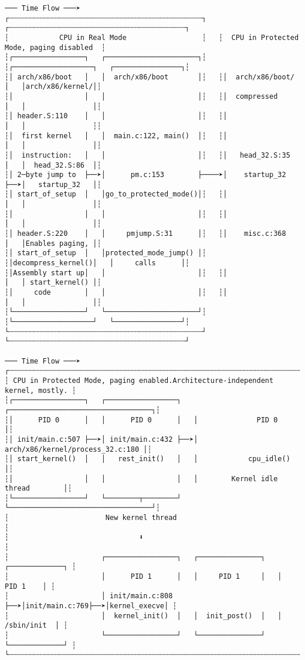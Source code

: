 \documentclass[varwidth=100em]{standalone}
\begin{document}
\begin{verbatim}
─── Time Flow ───➤
┌┄┄┄┄┄┄┄┄┄┄┄┄┄┄┄┄┄┄┄┄┄┄┄┄┄┄┄┄┄┄┄┄┄┄┄┄┄┄┄┄┄┄┄┄┄┄┐   ┌┄┄┄┄┄┄┄┄┄┄┄┄┄┄┄┄┄┄┄┄┄┄┄┄┄┄┄┄┄┄┄┄┄┄┄┄┄┄┄┄┄┄┐
┆            CPU in Real Mode                  ┆   ┆  CPU in Protected Mode, paging disabled  ┆
┆┌─────────────────┐   ┌──────────────────────┐┆   ┆┌───────────────────┐   ┌────────────────┐┆
┆│ arch/x86/boot   │   │  arch/x86/boot       │┆   ┆│  arch/x86/boot/   │   │arch/x86/kernel/│┆
┆│                 │   │                      │┆   ┆│  compressed       │   │                │┆
┆│ header.S:110    │   │                      │┆   ┆│                   │   │                ┆┆
┆│  first kernel   │   │  main.c:122, main()  │┆   ┆│                   │   │                │┆
┆│  instruction:   │   │                      │┆   ┆│   head_32.S:35    │   │  head_32.S:86  │┆
┆│ 2─byte jump to  ├──➤│      pm.c:153        ├────➤│    startup_32     ├──➤│   startup_32   │┆
┆│ start_of_setup  │   │go_to_protected_mode()│┆   ┆│                   │   │                │┆
┆│                 │   │                      │┆   ┆│                   │   │                │┆
┆│ header.S:220    │   │     pmjump.S:31      │┆   ┆│    misc.c:368     │   │Enables paging, │┆
┆│ start_of_setup  │   │protected_mode_jump() │┆   ┆│decompress_kernel()│   │     calls      │┆
┆│Assembly start up│   │                      │┆   ┆│                   │   │ start_kernel() │┆
┆│     code        │   │                      │┆   ┆│                   │   │                │┆
┆└─────────────────┘   └──────────────────────┘┆   ┆└───────────────────┘   └────────────────┘┆
└┄┄┄┄┄┄┄┄┄┄┄┄┄┄┄┄┄┄┄┄┄┄┄┄┄┄┄┄┄┄┄┄┄┄┄┄┄┄┄┄┄┄┄┄┄┄┘   └┄┄┄┄┄┄┄┄┄┄┄┄┄┄┄┄┄┄┄┄┄┄┄┄┄┄┄┄┄┄┄┄┄┄┄┄┄┄┄┄┄┄┘

─── Time Flow ───➤
┌┄┄┄┄┄┄┄┄┄┄┄┄┄┄┄┄┄┄┄┄┄┄┄┄┄┄┄┄┄┄┄┄┄┄┄┄┄┄┄┄┄┄┄┄┄┄┄┄┄┄┄┄┄┄┄┄┄┄┄┄┄┄┄┄┄┄┄┄┄┄┄┄┄┄┄┄┄┄┄┄┐
┆ CPU in Protected Mode, paging enabled.Architecture-independent kernel, mostly. ┆
┆┌─────────────────┐   ┌─────────────────┐   ┌──────────────────────────────────┐┆
┆│      PID 0      │   │      PID 0      │   │              PID 0               │┆
┆│ init/main.c:507 ├──➤│ init/main.c:432 ├──➤│ arch/x86/kernel/process_32.c:180 │┆
┆│ start_kernel()  │   │   rest_init()   │   │            cpu_idle()            │┆
┆│                 │   │                 │   │        Kernel idle thread        │┆
┆└─────────────────┘   └────────┬────────┘   └──────────────────────────────────┘┆
┆                       New kernel thread                                        ┆
┆                               ⬇                                                ┆
┆                      ┌─────────────────┐   ┌───────────────┐   ┌─────────────┐ ┆
┆                      │      PID 1      │   │     PID 1     │   │    PID 1    │ ┆
┆                      │ init/main.c:808 ├──➤│init/main.c:769├──➤│kernel_execve│ ┆
┆                      │  kernel_init()  │   │  init_post()  │   │ /sbin/init  │ ┆
┆                      └─────────────────┘   └───────────────┘   └─────────────┘ ┆
└┄┄┄┄┄┄┄┄┄┄┄┄┄┄┄┄┄┄┄┄┄┄┄┄┄┄┄┄┄┄┄┄┄┄┄┄┄┄┄┄┄┄┄┄┄┄┄┄┄┄┄┄┄┄┄┄┄┄┄┄┄┄┄┄┄┄┄┄┄┄┄┄┄┄┄┄┄┄┄┄┘
\end{verbatim}
\end{document}
